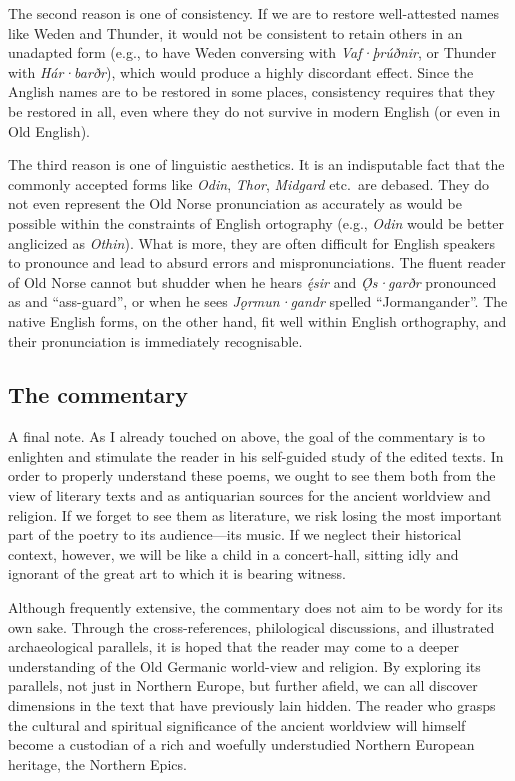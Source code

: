       The second reason is one of consistency.  If we are to restore well-attested names like Weden and Thunder, it would not be consistent to retain others in an unadapted form (e.g., to have Weden conversing with \emph{Vaf·þrúðnir}, or Thunder with \emph{Hár·barðr}), which would produce a highly discordant effect.  Since the Anglish names are to be restored in some places, consistency requires that they be restored in all, even where they do not survive in modern English (or even in Old English).

      The third reason is one of linguistic aesthetics.  It is an indisputable fact that the commonly accepted forms like \emph{Odin}, \emph{Thor}, \emph{Midgard} etc.~are debased.  They do not even represent the Old Norse pronunciation as accurately as would be possible within the constraints of English ortography (e.g., \emph{Odin} would be better anglicized as \emph{Othin}).  What is more, they are often difficult for English speakers to pronounce and lead to absurd errors and mispronunciations.  The fluent reader of Old Norse cannot but shudder when he hears \emph{ę́sir} and \emph{Ǫ́s·garðr} pronounced as  and “ass-guard”, or when he sees \emph{Jǫrmun·gandr} spelled “Jormangander”.  The native English forms, on the other hand, fit well within English orthography, and their pronunciation is immediately recognisable.

    \subsection{The commentary}

      A final note.  As I already touched on above, the goal of the commentary is to enlighten and stimulate the reader in his self-guided study of the edited texts.  In order to properly understand these poems, we ought to see them both from the view of literary texts and as antiquarian sources for the ancient worldview and religion.  If we forget to see them as literature, we risk losing the most important part of the poetry to its audience---its music.  If we neglect their historical context, however, we will be like a child in a concert-hall, sitting idly and ignorant of the great art to which it is bearing witness.

      Although frequently extensive, the commentary does not aim to be wordy for its own sake.  Through the cross-references, philological discussions, and illustrated archaeological parallels, it is hoped that the reader may come to a deeper understanding of the Old Germanic world-view and religion.  By exploring its parallels, not just in Northern Europe, but further afield, we can all discover dimensions in the text that have previously lain hidden.  The reader who grasps the cultural and spiritual significance of the ancient worldview will himself become a custodian of a rich and woefully understudied Northern European heritage, the Northern Epics.
